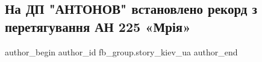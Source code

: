  
 
 
 
 

\subsection{На ДП "АНТОНОВ" встановлено рекорд з перетягування АН 225 «Мрія»}
\label{sec:26_08_2021.fb.fb_group.story_kiev_ua.1.na_dp__antonov__vsta}

\ifcmt
 author_begin
   author_id fb_group.story_kiev_ua
 author_end
\fi
